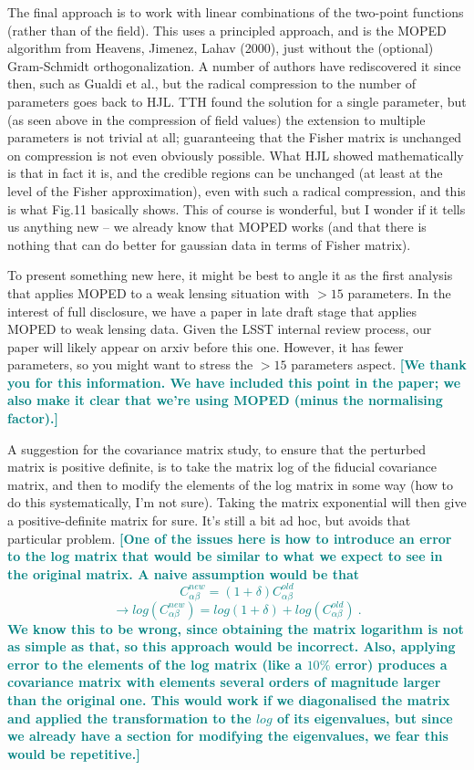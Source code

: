 \documentclass{article}
\newcommand\reply[1]{{\bf {\textcolor{teal}{[#1]}}}}
\begin{document}
	The final approach is to work with linear combinations of the two-point functions (rather than of the field).  This uses a principled approach, and is the MOPED algorithm from Heavens, Jimenez, Lahav (2000), just without the (optional) Gram-Schmidt orthogonalization.  A number of authors have rediscovered it since then, such as Gualdi et al., but the radical compression to the number of parameters goes back to HJL.  TTH found the solution for a single parameter, but (as seen above in the compression of field values) the extension to multiple parameters is not trivial at all; guaranteeing that the Fisher matrix is unchanged on compression is not even obviously possible.  What HJL showed mathematically is that in fact it is, and the credible regions can be unchanged (at least at the level of the Fisher approximation), even with such a radical compression, and this is what Fig.11 basically shows.  This of course is wonderful, but I wonder if it tells us anything new – we already know that MOPED works (and that there is nothing that can do better for gaussian data in terms of Fisher matrix).
	
	To present something new here, it might be best to angle it as the first analysis that applies MOPED to a weak lensing situation with $>15$ parameters.   In the interest of full disclosure, we have a paper in late draft stage that applies MOPED to weak lensing data.  Given the LSST internal review process, our paper will likely appear on arxiv before this one.  However, it has fewer parameters, so you might want to stress the $>15$ parameters aspect.
	\reply{We thank you for this information. We have included this point in the paper; we also make it clear that we're using MOPED (minus the normalising factor).}
	
	A suggestion for the covariance matrix study, to ensure that the perturbed matrix is positive definite, is to take the matrix log of the fiducial covariance matrix, and then to modify the elements of the log matrix in some way (how to do this systematically, I’m not sure).  Taking the matrix exponential will then give a positive-definite matrix for sure. It’s still a bit ad hoc, but avoids that particular problem. 
	\reply{One of the issues here is how to introduce an error to the log matrix that would be similar to what we expect to see in the original matrix. A naive assumption would be that 
	$$C^{new}_{\alpha \beta} = (1 + \delta)C^{old}_{\alpha \beta}$$
	$$\rightarrow log \left( C^{new}_{\alpha \beta}\right) = log(1 + \delta) + log \left( C^{old}_{\alpha \beta} \right)\ .$$ We know this to be wrong, since obtaining the matrix logarithm is not as simple as that, so this approach would be incorrect. Also, applying error to the elements of the log matrix (like a $10\%$ error) produces a covariance matrix with elements several orders of magnitude larger than the original one. This would work if we diagonalised the matrix and applied the transformation to the $log$ of its eigenvalues, but since we already have a section for modifying the eigenvalues, we fear this would be repetitive.}\\
\end{document}
